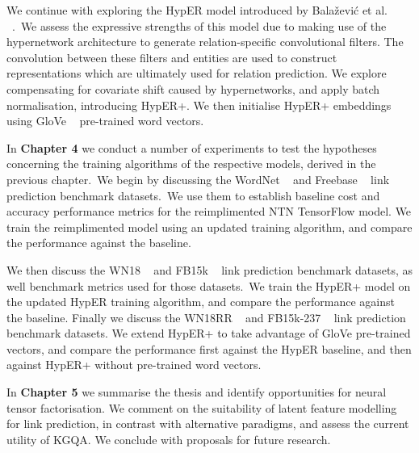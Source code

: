 \noindent We continue with exploring the HypER model introduced by Bala\v{z}evi\'c et al. \unskip ~\citep{balazevic2019hypernetwork}.\ We assess the expressive strengths of this model due to making use of the hypernetwork architecture to generate relation-specific convolutional filters. The convolution between these filters and entities are used to construct representations which are ultimately used for relation prediction. We explore compensating for covariate shift caused by hypernetworks, and apply batch normalisation, introducing HypER+. We then initialise HypER+ embeddings using GloVe \unskip~\citep{pennington2014glove} pre-trained word vectors. \par

\noindent In \textbf{Chapter 4} we conduct a number of experiments to test the hypotheses concerning the training algorithms of the respective models, derived in the previous chapter.\ We begin by discussing the WordNet \unskip ~\citep{miller1995wordnet} and Freebase \unskip ~\citep{bollacker2008freebase} link prediction benchmark datasets.\ We use them to establish baseline cost and accuracy performance metrics for the reimplimented NTN TensorFlow model. We train the reimplimented model using an updated training algorithm, and compare the performance against the baseline. \par

\noindent We then discuss the WN18 \unskip ~\citep{bordes2014semantic} and FB15k \unskip ~\citep{bordes2013translating} link prediction benchmark datasets, as well benchmark metrics used for those datasets.\ We train the HypER+ model on the updated HypER training algorithm, and compare the performance against the baseline. Finally we discuss the WN18RR \unskip ~\citep{dettmers2018convolutional} and FB15k-237 \unskip ~\citep{toutanova2015observed} link prediction benchmark datasets. We extend HypER+ to take advantage of GloVe pre-trained vectors, and  compare the performance first against the HypER baseline, and then against HypER+ without pre-trained word vectors. \par

\noindent In \textbf{Chapter 5} we summarise the thesis and identify opportunities for neural tensor factorisation. We comment on the suitability of latent feature modelling for link prediction, in contrast with alternative paradigms, and assess the current utility of KGQA. We conclude with proposals for future research.

